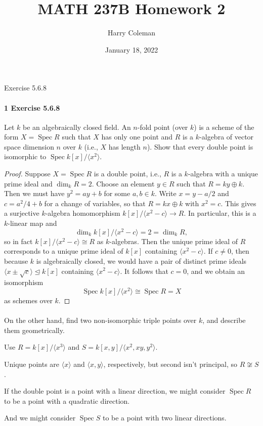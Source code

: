 \documentclass[12pt]{article}
\renewcommand{\maketitle}{\thispagestyle{title}}
\newlength{\myparskip}
\newenvironment{fullbox}{\begin{lrbox}{\savefullbox}\begin{minipage}{\dimexpr\textwidth-2\fboxsep\relax}\setlength{\parskip}{\myparskip}}{\end{minipage}\end{lrbox}\framebox[\textwidth]{\usebox{\savefullbox}}}
\newenvironment{pbox}[1][]{\begin{fullbox}\ifx#1\empty\else\paragraph{#1}\phantom{}\fi}{\end{fullbox}}
\theoremstyle{definition}
\newcommand{\<}{\langle}
\renewcommand{\>}{\rangle}
\newcommand{\isom}{\cong}
\newcommand{\teq}{\trianglelefteq}
\DeclareMathOperator{\Spec}{Spec}
\begin{document}
\title{MATH 237B Homework 2}
\author{Harry Coleman}
\date{January 18, 2022}
\maketitle


\begin{pbox}[1 Exercise 5.6.8]
    Let $k$ be an algebraically closed field.
    An $n$-fold point (over $k$) is a scheme of the form $X = \Spec R$ such that $X$ has only one point and $R$ is a $k$-algebra of vector space dimension $n$ over $k$ (i.e., $X$ has length $n$).
    Show that every double point is isomorphic to $\Spec k[x]/\<x^2\>$.
\end{pbox}

\begin{proof}
    Suppose $X = \Spec R$ is a double point, i.e., $R$ is a $k$-algebra with a unique prime ideal and $\dim_k R = 2$.
    Choose an element $y \in R$ such that $R = ky \oplus k$.
    Then we must have $y^2 = ay + b$ for some $a, b \in k$.
    Write $x = y - a/2$ and $c = a^2/4 + b$ for a change of variables, so that $R = kx \oplus k$ with $x^2 = c$.
    This gives a surjective $k$-algebra homomorphism $k[x]/\<x^2 - c\> \to R$.
    In particular, this is a $k$-linear map and
    \[
        \dim_k k[x]/\<x^2 - c\> = 2 = \dim_k R,
    \]
    so in fact $k[x]/\<x^2 - c\> \isom R$ as $k$-algebras.
    Then the unique prime ideal of $R$ corresponds to a unique prime ideal of $k[x]$ containing $\<x^2 - c\>$.
    If $c \ne 0$, then because $k$ is algebraically closed, we would have a pair of distinct prime ideals $\<x \pm \sqrt{c}\> \teq k[x]$ containing $\<x^2 - c\>$.
    It follows that $c = 0$, and we obtain an isomorphism
    \[
        \Spec k[x]/\<x^2\> \isom \Spec R = X
    \]
    as schemes over $k$.
\end{proof}


\begin{pbox}
    On the other hand, find two non-isomorphic triple points over $k$, and describe them geometrically.
\end{pbox}

Use $R = k[x]/\<x^3\>$ and $S = k[x, y]/\<x^2, xy, y^2\>$.

Unique points are $\<x\>$ and $\<x, y\>$, respectively, but second isn't principal, so $R \not\isom S$.

If the double point is a point with a linear direction, we might consider $\Spec R$ to be a point with a quadratic direction.

And we might consider $\Spec S$ to be a point with two linear directions.
\end{document}
